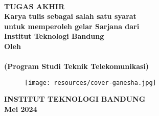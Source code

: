 \clearpage
\pagestyle{empty}


\begin{center}
    
    \smallskip
	\renewcommand{\baselinestretch}{1}
	
    \large{\bfseries \MakeUppercase{\thetitle}}
    \\[5\baselineskip]

    \large{\bfseries TUGAS AKHIR}
    \\[\baselineskip]
	
    \normalsize{ \bfseries
    	Karya tulis sebagai salah satu syarat\\
    	untuk memperoleh gelar Sarjana dari\\
    	Institut Teknologi Bandung
	}
    \\[3\baselineskip]

    \normalsize{ \bfseries Oleh\\}
    \large{ 
    	\bfseries \MakeUppercase{\theauthor}\\
    	(Program Studi Teknik Telekomunikasi)
	}

    \vfill
    \begin{figure}[h]
        \centering
      	\texttt{[image: resources/cover-ganesha.jpg]}
    \end{figure}
    \vfill

    \large{ \bfseries
	    \uppercase{
	        Institut Teknologi Bandung\\
	    }
    	Mei 2024
	}

\end{center}

\restoregeometry
\clearpage
